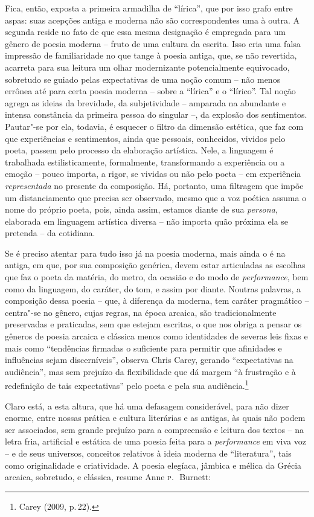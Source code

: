 Fica, então, exposta a primeira armadilha de “lírica”, que por isso grafo
entre aspas: suas acepções antiga e moderna não são correspondentes uma
à outra. A segunda reside no fato de que essa mesma designação é empregada para
um gênero de
poesia moderna -- fruto de uma cultura da escrita. Isso cria uma falsa impressão
de familiaridade no que tange à poesia antiga, que, se não revertida, acarreta
para sua leitura um olhar modernizante potencialmente equivocado, sobretudo se
guiado pelas expectativas de uma noção comum -- não menos errônea até para certa
poesia moderna -- sobre a “lírica” e o “lírico”. Tal noção agrega as ideias da
brevidade, da subjetividade -- amparada na abundante e intensa constância da
primeira pessoa do singular --, da explosão dos sentimentos. Pautar"-se por
ela, todavia, é esquecer o filtro da dimensão estética, que faz com que
experiências e sentimentos, ainda que pessoais, conhecidos, vividos pelo poeta,
passem pelo processo da elaboração artística. Nele, a linguagem é trabalhada
estilisticamente, formalmente, transformando a experiência ou a emoção -- pouco
importa, a rigor, se vividas ou não pelo poeta -- em experiência
\textit{representada} no presente da composição. Há, portanto, uma filtragem
que impõe um distanciamento que precisa ser observado, mesmo que a voz poética
assuma o nome do próprio poeta, pois, ainda assim, estamos diante de sua
\textit{persona}, elaborada em linguagem artística diversa -- não importa
quão próxima ela se pretenda -- da cotidiana.

Se é preciso atentar para tudo isso já na poesia moderna, mais ainda o é na antiga, em que, por sua composição genérica, devem
estar articuladas as escolhas que faz o poeta da matéria, do metro, da ocasião
e do modo de \textit{performance}, bem como da linguagem, do caráter, do tom, e
assim por diante. Noutras palavras, a composição dessa poesia -- que, à diferença
da moderna, tem caráter pragmático -- centra"-se no gênero, cujas regras,
na época arcaica, são tradicionalmente preservadas e praticadas, sem que
estejam escritas, o que nos obriga a pensar os gêneros de poesia arcaica e
clássica menos como identidades de severas leis fixas e mais como
“tendências firmadas o suficiente para permitir que afinidades e influências
sejam discerníveis”, observa Chris Carey, gerando
“expectativas na audiência”, mas sem prejuízo da flexibilidade que dá margem “à
frustração e à redefinição de tais expectativas” pelo poeta e pela sua
audiência.\footnote{ Carey (2009, p.\,22).}

Claro está, a esta altura, que há uma defasagem considerável, para não dizer
enorme, entre nossas prática e cultura literárias e as antigas, às quais não
podem ser associados, sem grande prejuízo para a compreensão e leitura dos
textos -- na letra fria, artificial e estática de uma poesia feita para a
\textit{performance} em viva voz -- e de seus universos, conceitos relativos à
ideia moderna de “literatura”, tais como originalidade e criatividade. A poesia
elegíaca, jâmbica e mélica da Grécia arcaica, sobretudo, e clássica, resume
Anne \textsc{p}.~\,Burnett: 

